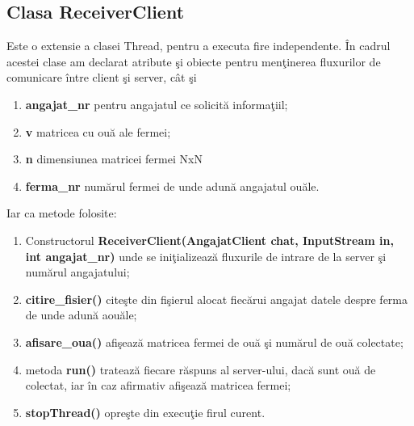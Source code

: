 \documentclass[12pt,a4paper]{article}
\begin{document}
\subsection{Clasa ReceiverClient}
	Este o extensie a clasei Thread, pentru a executa fire independente.	
	\^{I}n cadrul acestei clase am declarat atribute \c{s}i obiecte pentru men\c{t}inerea fluxurilor de comunicare \^{i}ntre client \c{s}i server, c\^{a}t \c{s}i 
	\begin{enumerate}
		\item \textbf{angajat\_nr} pentru angajatul ce solicit\u{a} informa\c{t}iil;
 		\item \textbf{v} matricea cu ou\u{a} ale fermei;
  		\item \textbf{n} dimensiunea matricei fermei NxN
  		\item \textbf{ferma\_nr} num\u{a}rul fermei de unde adun\u{a} angajatul ou\u{a}le.
	\end{enumerate}		
	Iar ca metode folosite:
	\begin{enumerate}
		\item Constructorul \textbf{ReceiverClient(AngajatClient chat, InputStream in, int angajat\_nr)} unde se ini\c{t}ializeaz\u{a} fluxurile de intrare de la server \c{s}i num\u{a}rul angajatului;
		\item \textbf{citire\_fisier()} cite\c{s}te din fi\c{s}ierul alocat fiec\u{a}rui angajat datele despre ferma de unde adun\u{a} aou\u{a}le;
		\item \textbf{afisare\_oua()} afi\c{s}eaz\u{a} matricea fermei de ou\u{a} \c{s}i num\u{a}rul de ou\u{a} colectate;
   		\item metoda \textbf{run()} trateaz\u{a} fiecare r\u{a}spuns al server-ului, dac\u{a} sunt ou\u{a} de colectat, iar \^{i}n caz afirmativ afi\c{s}eaz\u{a} matricea fermei;
   		\item \textbf{stopThread()} opre\c{s}te din execu\c{t}ie firul curent.
	\end{enumerate}
	
\end{document}
